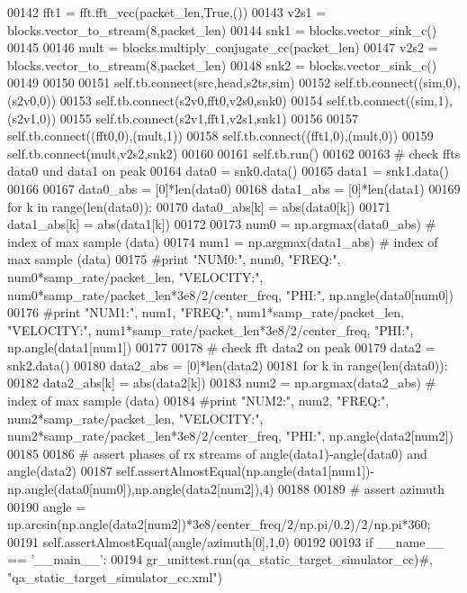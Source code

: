 \begin{DoxyCode}
00142         fft1 = fft.fft\_vcc(packet\_len,\textcolor{keyword}{True},())
00143         v2s1 = blocks.vector\_to\_stream(8,packet\_len)
00144         snk1 = blocks.vector\_sink\_c()
00145         
00146         mult = blocks.multiply\_conjugate\_cc(packet\_len)
00147         v2s2 = blocks.vector\_to\_stream(8,packet\_len)
00148         snk2 = blocks.vector\_sink\_c()
00149         
00150         
00151         self.tb.connect(src,head,s2ts,sim)
00152         self.tb.connect((sim,0),(s2v0,0))
00153         self.tb.connect(s2v0,fft0,v2s0,snk0)
00154         self.tb.connect((sim,1),(s2v1,0))
00155         self.tb.connect(s2v1,fft1,v2s1,snk1)
00156         
00157         self.tb.connect((fft0,0),(mult,1))
00158         self.tb.connect((fft1,0),(mult,0))
00159         self.tb.connect(mult,v2s2,snk2)
00160         
00161         self.tb.run()
00162         
00163         \textcolor{comment}{# check ffts data0 und data1 on peak}
00164         data0 = snk0.data()
00165         data1 = snk1.data()
00166         
00167         data0\_abs = [0]*len(data0)
00168         data1\_abs = [0]*len(data1)
00169         \textcolor{keywordflow}{for} k \textcolor{keywordflow}{in} range(len(data0)):
00170             data0\_abs[k] = abs(data0[k])
00171             data1\_abs[k] = abs(data1[k])
00172         
00173         num0 = np.argmax(data0\_abs) \textcolor{comment}{# index of max sample (data)}
00174         num1 = np.argmax(data1\_abs) \textcolor{comment}{# index of max sample (data)}
00175         \textcolor{comment}{#print "NUM0:", num0, "FREQ:", num0*samp\_rate/packet\_len, "VELOCITY:",
       num0*samp\_rate/packet\_len*3e8/2/center\_freq, "PHI:", np.angle(data0[num0])}
00176         \textcolor{comment}{#print "NUM1:", num1, "FREQ:", num1*samp\_rate/packet\_len, "VELOCITY:",
       num1*samp\_rate/packet\_len*3e8/2/center\_freq, "PHI:", np.angle(data1[num1])}
00177         
00178         \textcolor{comment}{# check fft data2 on peak}
00179         data2 = snk2.data()
00180         data2\_abs = [0]*len(data2)
00181         \textcolor{keywordflow}{for} k \textcolor{keywordflow}{in} range(len(data0)):
00182             data2\_abs[k] = abs(data2[k])
00183         num2 = np.argmax(data2\_abs) \textcolor{comment}{# index of max sample (data)}
00184         \textcolor{comment}{#print "NUM2:", num2, "FREQ:", num2*samp\_rate/packet\_len, "VELOCITY:",
       num2*samp\_rate/packet\_len*3e8/2/center\_freq, "PHI:", np.angle(data2[num2])}
00185         
00186         \textcolor{comment}{# assert phases of rx streams of angle(data1)-angle(data0) and angle(data2)}
00187         self.assertAlmostEqual(np.angle(data1[num1])-np.angle(data0[num0]),np.angle(data2[num2]),4)
00188         
00189         \textcolor{comment}{# assert azimuth}
00190         angle = np.arcsin(np.angle(data2[num2])*3e8/center\_freq/2/np.pi/0.2)/2/np.pi*360;
00191         self.assertAlmostEqual(angle/azimuth[0],1,0)
00192 
00193 \textcolor{keywordflow}{if} \_\_name\_\_ == \textcolor{stringliteral}{'\_\_main\_\_'}:
00194     gr\_unittest.run(qa\_static\_target\_simulator\_cc)\textcolor{comment}{#, "qa\_static\_target\_simulator\_cc.xml")}
\end{DoxyCode}
